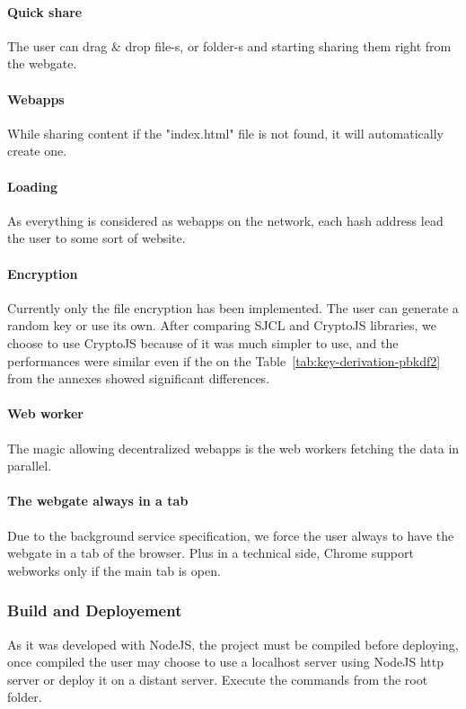 \paragraph{Quick share} The user can drag \& drop file-s, or folder-s and starting sharing them right from the webgate.

\paragraph{Webapps} While sharing content if the "index.html" file is not found, it will automatically create one.

\paragraph{Loading} As everything is considered as webapps on the network, each hash address lead the user to some sort of website.

\paragraph{Encryption} Currently only the file encryption has been implemented. The user can generate a random key or use its own. After comparing SJCL\cite{Stark2009SymmetricJavascript} and CryptoJS\cite{Brix2013CryptoJS} libraries, we choose to use CryptoJS because of it was much simpler to use, and the performances were similar even if the on the Table~\ref{tab:key-derivation-pbkdf2} from the annexes showed significant differences.

\paragraph{Web worker} The magic allowing decentralized webapps is the web workers fetching the data in parallel.

\paragraph{The webgate always in a tab} Due to the background service specification, we force the user always to have the webgate in a tab of the browser. Plus in a technical side, Chrome support webworks only if the main tab is open.

\subsubsection{Build and Deployement} As it was developed with NodeJS, the project must be compiled before deploying, once compiled the user may choose to use a localhost server using NodeJS http server or deploy it on a distant server. Execute the commands from the root folder.

